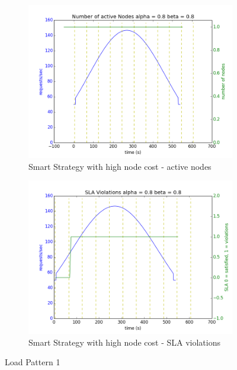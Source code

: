 \documentclass[12pt]{article}
\begin{document}
\begin{figure}[h!]
\begin{subfigure}{.5\textwidth}
\includegraphics[width=\textwidth]{Smart188nodes.png}
\caption{Smart Strategy with high node cost - active nodes}
\end{subfigure}
\begin{subfigure}{.5\textwidth}
\includegraphics[width=\textwidth]{Smart188SLA.png}
\caption{Smart Strategy with high node cost - SLA violations}
\end{subfigure}

\label{load1}
\caption{Load Pattern 1}
\end{figure}
\end{document}
